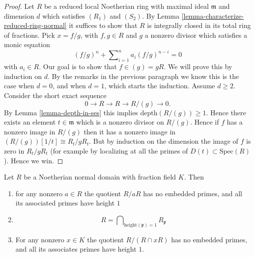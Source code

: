 \begin{proof}
\medskip\noindent
Let $R$ be a reduced local Noetherian ring with maximal ideal
$\mathfrak m$ and dimension $d$ which satisfies $(R_1)$ and
$(S_2)$. By Lemma \ref{lemma-characterize-reduced-ring-normal}
it suffices to show that $R$ is integrally closed in its
total ring of fractions.
Pick $x = f/g$, with $f, g \in R$ and $g$ a nonzero divisor
which satisfies a monic equation
$$
(f/g)^n + \sum\nolimits_{i = 1}^n a_i(f/g)^{n - i} = 0
$$
with $a_i \in R$.
Our goal is to show that $f \in (g) = gR$. We will prove this by induction
on $d$. By the remarks in the previous paragraph we know this
is the case when $d = 0$, and when $d = 1$, which starts the induction.
Assume $d \geq 2$. Consider the short exact sequence
$$
0 \to R \to R \to R/(g) \to 0.
$$
By Lemma \ref{lemma-depth-in-ses} this implies $\text{depth}(R/(g)) \geq 1$.
Hence there exists an element $t \in \mathfrak m$ which is a nonzero
divisor on $R/(g)$. Hence if $f$ has a nonzero image in
$R/(g)$ then it has a nonzero image in
$(R/(g))[1/t] \cong R_t/gR_t$. But by induction on the dimension
the image of $f$ is zero in $R_t/gR_t$ (for example by localizing at all
the primes of $D(t) \subset \text{Spec}(R)$). Hence we win.
\end{proof}

\begin{lemma}
\label{lemma-normal-domain-intersection-localizations-height-1}
Let $R$ be a Noetherian normal domain with fraction field $K$. Then
\begin{enumerate}
\item for any nonzero $a \in R$ the quotient $R/aR$ has no embedded primes,
and all its associated primes have height $1$
\item
$$
R = \bigcap\nolimits_{\text{height}(\mathfrak p) = 1} R_{\mathfrak p}
$$
\item For any nonzero $x \in K$ the quotient $R/(R \cap xR)$
has no embedded primes, and all its associates primes have height $1$.
\end{enumerate}
\end{lemma}


